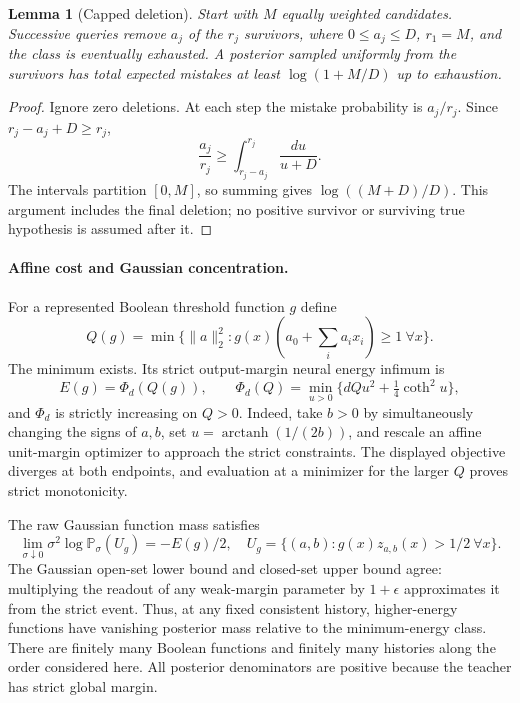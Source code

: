 \documentclass[11pt]{article}
\newtheorem{lemma}{Lemma}
\begin{document}
\begin{lemma}[Capped deletion]
Start with $M$ equally weighted candidates. Successive queries remove $a_j$ of the $r_j$ survivors, where $0\le a_j\le D$, $r_1=M$, and the class is eventually exhausted. A posterior sampled uniformly from the survivors has total expected mistakes at least $\log(1+M/D)$ up to exhaustion.
\end{lemma}
\begin{proof}
Ignore zero deletions. At each step the mistake probability is $a_j/r_j$. Since $r_j-a_j+D\ge r_j$,
\[
 \frac{a_j}{r_j}\ge\int_{r_j-a_j}^{r_j}\frac{du}{u+D}.
\]
The intervals partition $[0,M]$, so summing gives $\log((M+D)/D)$. This argument includes the final deletion; no positive survivor or surviving true hypothesis is assumed after it.
\end{proof}

\paragraph{Affine cost and Gaussian concentration.}
For a represented Boolean threshold function $g$ define
\[
 Q(g)=\min\{\|a\|_2^2:g(x)(a_0+\sum_i a_ix_i)\ge1\ \forall x\}.
\]
The minimum exists. Its strict output-margin neural energy infimum is
\[
 E(g)=\Phi_d(Q(g)),\qquad
 \Phi_d(Q)=\min_{u>0}\{dQu^2+\tfrac14\coth^2u\},
\]
and $\Phi_d$ is strictly increasing on $Q>0$. Indeed, take $b>0$ by simultaneously changing the signs of $a,b$, set $u=\operatorname{arctanh}(1/(2b))$, and rescale an affine unit-margin optimizer to approach the strict constraints. The displayed objective diverges at both endpoints, and evaluation at a minimizer for the larger $Q$ proves strict monotonicity.

The raw Gaussian function mass satisfies
\[
 \lim_{\sigma\downarrow0}\sigma^2\log\mathbb P_\sigma(U_g)=-E(g)/2,
 \quad U_g=\{(a,b):g(x)z_{a,b}(x)>1/2\ \forall x\}.
\]
The Gaussian open-set lower bound and closed-set upper bound agree: multiplying the readout of any weak-margin parameter by $1+\epsilon$ approximates it from the strict event. Thus, at any fixed consistent history, higher-energy functions have vanishing posterior mass relative to the minimum-energy class. There are finitely many Boolean functions and finitely many histories along the order considered here. All posterior denominators are positive because the teacher has strict global margin.
\end{document}
